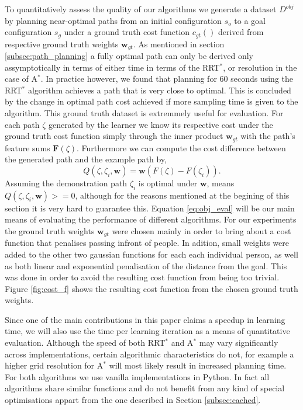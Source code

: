 \documentclass{article}  %
\begin{document}
	To quantitatively assess the quality of our algorithms we generate a dataset $D^{obj}$ by planning near-optimal paths from an initial configuration $s_o$ to a goal configuration $s_g$ under a ground truth cost function $c_{gt}()$ derived from respective ground truth weights $\mathbf{w}_{gt}$. As mentioned in section \ref{subsec:path_planning} a fully optimal path can only be derived only assymptotically in terms of either time in terms of the RRT$^*$, or resolution in the case of A$^*$. In practice however, we found that planning for 60 seconds using the RRT$^*$ algorithm achieves a path that is very close to optimal. This is concluded by the change in optimal path cost achieved if more sampling time is given to the algorithm. This ground truth dataset is extremmely useful for evaluation. For each path $\zeta$ generated by the learner we know its respective cost under the ground truth cost function simply through the inner product $\mathbf{w}_{gt}$ with the path's feature sums $\mathbf{F}(\zeta)$. Furthermore we can compute the cost difference between the generated path and the example path by,
	\begin{equation}
		Q(\zeta,\zeta_i,\mathbf{w}) = \mathbf{w}(F(\zeta)-F(\zeta_i)). \label{eq:obj_eval}
	\end{equation} 
	Assuming the demonstration path $\zeta_i$ is optimal under $\mathbf{w}$, means $Q(\zeta,\zeta_i,\mathbf{w})>=0$, although for the reasons mentioned at the begining of this section it is very hard to guarantee this. Equation \eqref{eq:obj_eval} will be our main means of evaluating the performance of different algorithms. For our experiments the ground truth weights $\mathbf{w}_{gt}$ were chosen mainly in order to bring about a cost function that penalises passing infront of people. In adition, small weights were added to the other two gaussian functions for each each individual person, as well as both linear and exponential penalisation of the distance from the goal. This was done in order to avoid the resulting cost function from being too trivial. Figure \ref{fig:cost_f} shows the resulting cost function from the chosen ground truth weights.

	Since one of the main contributions in this paper claims a speedup in learning time, we will also use the time per learning iteration as a means of quantitative evaluation. Although the speed of both RRT$^*$ and A$^*$ may vary significantly across implementations, certain algorithmic characteristics do not, for example a higher grid resolution for A$^*$ will most likely result in increased planning time. For both algorithms we use vanilla implementations in Python. In fact all algorithms share similar functions and do not benefit from any kind of special optimisations appart from the one described in Section \ref{subsec:cached}.
\end{document}
